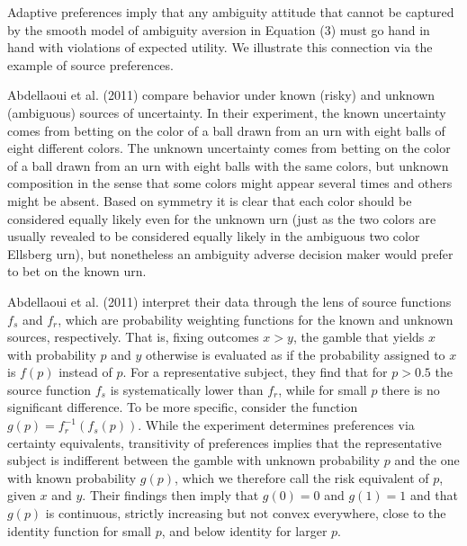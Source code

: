 \documentclass[12pt,a4paper]{article}
\newenvironment{original}
  {\par\noindent\color{black}\smallskip}
  {\par\smallskip}
\begin{document}
\begin{original}
Adaptive preferences imply that any ambiguity attitude that cannot be captured by the smooth model of ambiguity aversion in Equation (3) must go hand in hand with violations of expected utility. We illustrate this connection via the example of source preferences.

Abdellaoui et al. (2011) compare behavior under known (risky) and unknown (ambiguous) sources of uncertainty. In their experiment, the known uncertainty comes from betting on the color of a ball drawn from an urn with eight balls of eight different colors. The unknown uncertainty comes from betting on the color of a ball drawn from an urn with eight balls with the same colors, but unknown composition in the sense that some colors might appear several times and others might be absent. Based on symmetry it is clear that each color should be considered equally likely even for the unknown urn (just as the two colors are usually revealed to be considered equally likely in the ambiguous two color Ellsberg urn), but nonetheless an ambiguity adverse decision maker would prefer to bet on the known urn.

Abdellaoui et al. (2011) interpret their data through the lens of source functions $f_s$ and $f_r$, which are probability weighting functions for the known and unknown sources, respectively. That is, fixing outcomes $x > y$, the gamble that yields $x$ with probability $p$ and $y$ otherwise is evaluated as if the probability assigned to $x$ is $f(p)$ instead of $p$. For a representative subject, they find that for $p > 0.5$ the source function $f_s$ is systematically lower than $f_r$, while for small $p$ there is no significant difference. To be more specific, consider the function $g(p) = f_r^{-1}(f_s(p))$. While the experiment determines preferences via certainty equivalents, transitivity of preferences implies that the representative subject is indifferent between the gamble with unknown probability $p$ and the one with known probability $g(p)$, which we therefore call the risk equivalent of $p$, given $x$ and $y$. Their findings then imply that $g(0) = 0$ and $g(1) = 1$ and that $g(p)$ is continuous, strictly increasing but not convex everywhere, close to the identity function for small $p$, and below identity for larger $p$.
\end{original}
\end{document}

